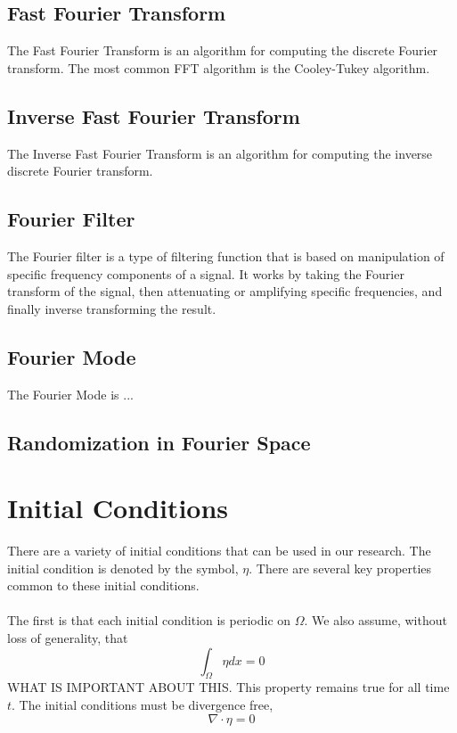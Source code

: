 \documentclass[12pt]{article}
\begin{document}
\begin{flushleft}
\subsection{Fast Fourier Transform}

The Fast Fourier Transform is an algorithm for computing the discrete Fourier transform. The most common FFT algorithm is the Cooley-Tukey algorithm.

\subsection{Inverse Fast Fourier Transform}

The Inverse Fast Fourier Transform is an algorithm for computing the inverse discrete Fourier transform.

\subsection{Fourier Filter}

The Fourier filter is a type of filtering function that is based on manipulation of specific frequency components of a signal. It works by taking the Fourier transform of the signal, then attenuating or amplifying specific frequencies, and finally inverse transforming the result.

\subsection{Fourier Mode}

The Fourier Mode is ...

\subsection{Randomization in Fourier Space}

\section{Initial Conditions}

There are a variety of initial conditions that can be used in our research. The initial condition is denoted by the symbol, $\eta$. There are several key properties common to these initial conditions. 
\\~\\
The first is that each initial condition is periodic on $\Omega$. We also assume, without loss of generality, that
$$\int_{\Omega}\eta dx = 0$$
WHAT IS IMPORTANT ABOUT THIS. This property remains true for all time $t$. The initial conditions must be divergence free, 
$$\nabla \cdot \eta = 0$$


\end{flushleft}
\end{document}
